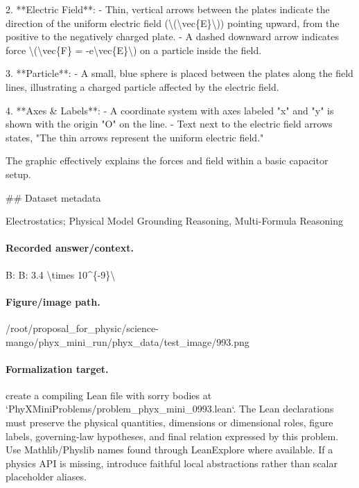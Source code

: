 2. **Electric Field**:
   - Thin, vertical arrows between the plates indicate the direction of the uniform electric field (\textbackslash{}(\textbackslash{}vec\{E\}\textbackslash{})) pointing upward, from the positive to the negatively charged plate.
   - A dashed downward arrow indicates force \textbackslash{}(\textbackslash{}vec\{F\} = -e\textbackslash{}vec\{E\}\textbackslash{}) on a particle inside the field.

3. **Particle**:
   - A small, blue sphere is placed between the plates along the field lines, illustrating a charged particle affected by the electric field.

4. **Axes \& Labels**:
   - A coordinate system with axes labeled "x" and "y" is shown with the origin "O" on the line.
   - Text next to the electric field arrows states, "The thin arrows represent the uniform electric field."

The graphic effectively explains the forces and field within a basic capacitor setup.

\#\# Dataset metadata

Electrostatics; Physical Model Grounding Reasoning, Multi-Formula Reasoning

\paragraph{Recorded answer/context.}
B: B: 3.4 \textbackslash{}times 10\textasciicircum{}\{-9\}\textbackslash{}

\paragraph{Figure/image path.}
/root/proposal\_for\_physic/science-mango/phyx\_mini\_run/phyx\_data/test\_image/993.png

\paragraph{Formalization target.}
create a compiling Lean file with sorry bodies at `PhyXMiniProblems/problem\_phyx\_mini\_0993.lean`. The Lean declarations must preserve the physical quantities, dimensions or dimensional roles, figure labels, governing-law hypotheses, and final relation expressed by this problem.
Use Mathlib/Physlib names found through LeanExplore where available. If a physics API is missing, introduce faithful local abstractions rather than scalar placeholder aliases.

